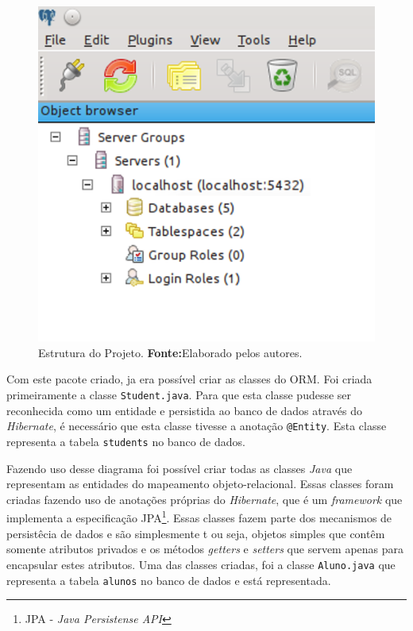 \begin{figure}[h!]
	\centerline{\includegraphics[scale=0.8]{./imagens/2_q_metodologico/4_procedimentos_resultados/43_webservice/432_desenvolvimento/desws.png}}
	\caption[Estrutura do Projeto]{Estrutura do Projeto.
		\textbf{Fonte:}Elaborado pelos autores.}
	\label{fig:desws1}
\end{figure}
		
	\par Com este pacote criado, ja era possível criar as classes do ORM. Foi
criada primeiramente a classe \texttt{Student.java}. Para que esta classe
pudesse ser reconhecida como um entidade e persistida ao banco de dados através
do \textit{Hibernate}, é necessário que esta classe tivesse a anotação
\texttt{@Entity}. Esta classe representa a tabela \texttt{students} no banco de
dados.




	
	
			
	
		\par Fazendo uso desse diagrama foi possível criar todas as classes 
	\textit{Java} que representam as entidades do mapeamento objeto-relacional. 
	Essas classes foram criadas fazendo uso de anotações próprias do
	\textit{Hibernate}, que é um \textit{framework} que implementa a especificação
	JPA\footnote{JPA - \textit{Java Persistense API}}. Essas classes fazem parte
	dos mecanismos de persistêcia de dados e são simplesmente t ou seja, objetos
	simples que contêm somente atributos privados e os métodos \textit{getters} e
	\textit{setters} que servem apenas para encapsular estes atributos. Uma das
	classes criadas, foi a classe \texttt{Aluno.java} que representa a tabela
	\texttt{alunos} no banco de dados e está representada.
		
